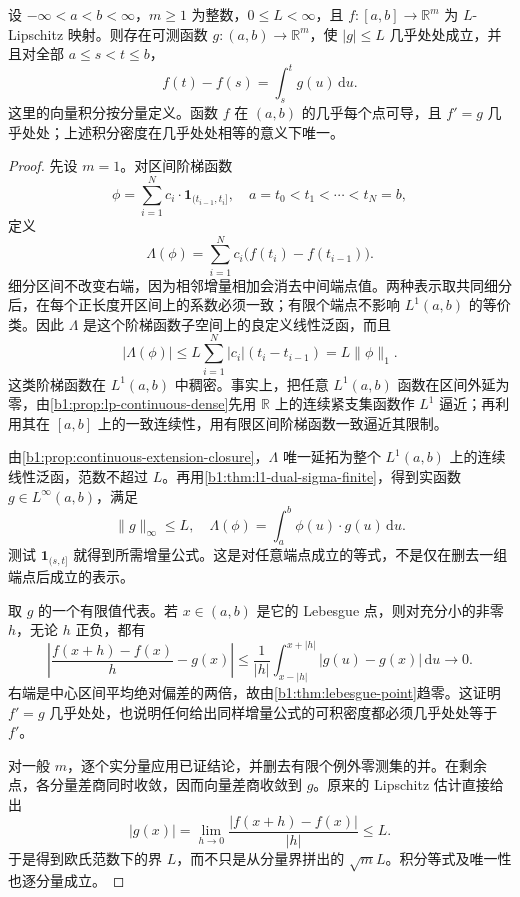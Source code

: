 \begin{theorem}\label{b1:thm:one-dimensional-lipschitz-ftc}
设 \(-\infty<a<b<\infty\)，\(m\ge1\) 为整数，\(0\le L<\infty\)，且 \(f:[a,b]\rightarrow\mathbb R^m\) 为 \(L\)-Lipschitz 映射。则存在可测函数 \(g:(a,b)\rightarrow\mathbb R^m\)，使 \(|g|\leq L\) 几乎处处成立，并且对全部 \(a\leq s<t\leq b\)，
\[
 f(t)-f(s)=\int_s^t g(u)\,\mathrm du.
\]
这里的向量积分按分量定义。函数 \(f\) 在 \((a,b)\) 的几乎每个点可导，且 \(f'=g\) 几乎处处；上述积分密度在几乎处处相等的意义下唯一。
\end{theorem}
\begin{proof}
先设 \(m=1\)。对区间阶梯函数
\[
 \phi=\sum_{i=1}^N c_i\cdot\mathbf1_{(t_{i-1},t_i]},
 \quad a=t_0<t_1<\cdots<t_N=b,
\]
定义
\[
 \Lambda(\phi)=\sum_{i=1}^N c_i\bigl(f(t_i)-f(t_{i-1})\bigr).
\]
细分区间不改变右端，因为相邻增量相加会消去中间端点值。两种表示取共同细分后，在每个正长度开区间上的系数必须一致；有限个端点不影响 \(L^1(a,b)\) 的等价类。因此 \(\Lambda\) 是这个阶梯函数子空间上的良定义线性泛函，而且
\[
 |\Lambda(\phi)|
 \leq L\sum_{i=1}^N|c_i|(t_i-t_{i-1})
 =L\|\phi\|_1.
\]
这类阶梯函数在 \(L^1(a,b)\) 中稠密。事实上，把任意 \(L^1(a,b)\) 函数在区间外延为零，由\cref{b1:prop:lp-continuous-dense}先用 \(\mathbb R\) 上的连续紧支集函数作 \(L^1\) 逼近；再利用其在 \([a,b]\) 上的一致连续性，用有限区间阶梯函数一致逼近其限制。

由\cref{b1:prop:continuous-extension-closure}，\(\Lambda\) 唯一延拓为整个 \(L^1(a,b)\) 上的连续线性泛函，范数不超过 \(L\)。再用\cref{b1:thm:l1-dual-sigma-finite}，得到实函数 \(g\in L^\infty(a,b)\)，满足
\[
 \|g\|_\infty\leq L,\quad
 \Lambda(\phi)=\int_a^b\phi(u)\cdot g(u)\,\mathrm du.
\]
测试 \(\mathbf1_{(s,t]}\) 就得到所需增量公式。这是对任意端点成立的等式，不是仅在删去一组端点后成立的表示。

取 \(g\) 的一个有限值代表。若 \(x\in(a,b)\) 是它的 Lebesgue 点，则对充分小的非零 \(h\)，无论 \(h\) 正负，都有
\[
 \left|\frac{f(x+h)-f(x)}h-g(x)\right|
 \leq\frac1{|h|}\int_{x-|h|}^{x+|h|}
                 |g(u)-g(x)|\,\mathrm du
 \longrightarrow0.
\]
右端是中心区间平均绝对偏差的两倍，故由\cref{b1:thm:lebesgue-point}趋零。这证明 \(f'=g\) 几乎处处，也说明任何给出同样增量公式的可积密度都必须几乎处处等于 \(f'\)。

对一般 \(m\)，逐个实分量应用已证结论，并删去有限个例外零测集的并。在剩余点，各分量差商同时收敛，因而向量差商收敛到 \(g\)。原来的 Lipschitz 估计直接给出
\[
 |g(x)|=\lim_{h\to0}\frac{|f(x+h)-f(x)|}{|h|}\leq L.
\]
于是得到欧氏范数下的界 \(L\)，而不只是从分量界拼出的 \(\sqrt mL\)。积分等式及唯一性也逐分量成立。
\end{proof}


